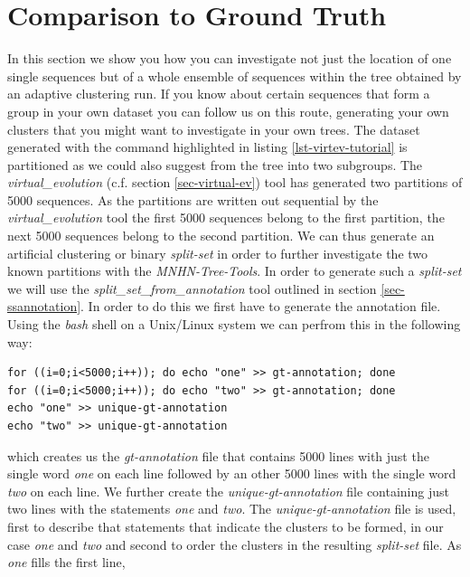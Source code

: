 \section{Comparison to Ground Truth}

In this section we show you how you can investigate not just the location
of one single sequences but of a whole ensemble of sequences within the tree
obtained by an adaptive clustering run. If you know about certain
sequences that form a group in your own dataset you can follow us on
this route, generating your own clusters that you might want to
investigate in your own trees. The dataset generated with the command
highlighted in listing \ref{lst-virtev-tutorial} is partitioned as we
could also suggest from the tree into two subgroups. The
\emph{virtual\_evolution} (c.f. section \ref{sec-virtual-ev}) tool has
generated two partitions of 5000 sequences. As the partitions are
written out sequential by the \emph{virtual\_evolution} tool the
first 5000 sequences belong to the first partition, the next 5000
sequences belong to the second partition. We can thus generate an
artificial clustering or binary \emph{split-set} in order to further
investigate the two known partitions with the \emph{MNHN-Tree-Tools}. In
order to generate such a \emph{split-set} we will use the
\emph{split\_set\_from\_annotation} tool outlined in section
\ref{sec-ssannotation}. In order to do this we first have to
generate the annotation file. Using the \emph{bash} \cite{bash} shell on
a Unix/Linux system we can perfrom this in the following way:
\begin{lstlisting}
for ((i=0;i<5000;i++)); do echo "one" >> gt-annotation; done
for ((i=0;i<5000;i++)); do echo "two" >> gt-annotation; done
echo "one" >> unique-gt-annotation
echo "two" >> unique-gt-annotation
\end{lstlisting}
which creates us the \emph{gt-annotation} file that contains 5000
lines with just the single word \emph{one} on each line followed by an
other 5000 lines with the single word \emph{two} on each line. We
further create the \emph{unique-gt-annotation} file containing just
two lines with the statements \emph{one} and \emph{two}. The
\emph{unique-gt-annotation} file is used, first to describe that
statements that indicate the clusters to be formed, in our case
\emph{one} and \emph{two} and second to order the clusters in the
resulting \emph{split-set} file. As \emph{one} fills the first line,
